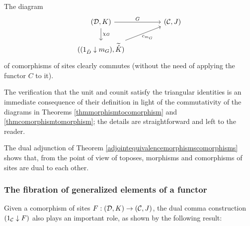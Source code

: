 \documentclass[a4paper,12pt]{article}
\begin{document}
\begin{proofs}
	The diagram
	\begin{equation*}
	\begin{tikzcd}
	({\cal D}, K) \arrow[rr, "G"] \ar[d, "\chi_{G}"]  & &  ({\cal C}, J)           \\ 
	((1_{\hat{D}}\downarrow m_{G}), \widetilde{\hat{K}}) \ar[urr, "c_{m_{G}}"{below, xshift=1.5ex}] &  &
	\end{tikzcd}
	\end{equation*}	
	{\flushleft
	of comorphisms of sites clearly commutes (without the need of applying the functor $C$ to it).}
	
	The verification that the unit and counit satisfy the triangular identities is an immediate consequence of their definition in light of the commutativity of the diagrams in Theorems \ref{thmmorphismtocomorphism} and \ref{thmcomorphismtomorphism}; the details are straightforward and left to the reader.	
\end{proofs}

The dual adjunction of Theorem \ref{adjointequivalencemorphismscomorphisms} shows that, from the point of view of toposes, morphisms and comorphisms of sites are dual to each other.	


\subsubsection{The fibration of generalized elements of a functor}\label{sec:fibrgenelements}

Given a comorphism of sites $F:({\cal D}, K)\to ({\cal C}, J)$, the dual comma construction $(1_{\cal C}\downarrow F)$ also plays an important role, as shown by the following result:
\end{document}
